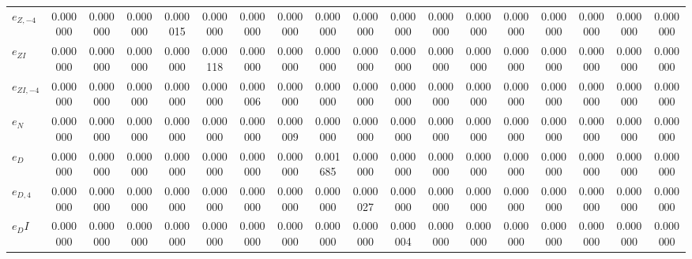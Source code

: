 \begin{center}
\begin{longtable}{lccccccccccccccccc}
${e_{Z,-4}}    $	 & 	        0.000000	 & 	        0.000000	 & 	        0.000000	 & 	        0.000015	 & 	        0.000000	 & 	        0.000000	 & 	        0.000000	 & 	        0.000000	 & 	        0.000000	 & 	        0.000000	 & 	        0.000000	 & 	        0.000000	 & 	        0.000000	 & 	        0.000000	 & 	        0.000000	 & 	        0.000000	 & 	        0.000000 \\ 
${e_{ZI}}      $	 & 	        0.000000	 & 	        0.000000	 & 	        0.000000	 & 	        0.000000	 & 	        0.000118	 & 	        0.000000	 & 	        0.000000	 & 	        0.000000	 & 	        0.000000	 & 	        0.000000	 & 	        0.000000	 & 	        0.000000	 & 	        0.000000	 & 	        0.000000	 & 	        0.000000	 & 	        0.000000	 & 	        0.000000 \\ 
${e_{ZI,-4}}   $	 & 	        0.000000	 & 	        0.000000	 & 	        0.000000	 & 	        0.000000	 & 	        0.000000	 & 	        0.000006	 & 	        0.000000	 & 	        0.000000	 & 	        0.000000	 & 	        0.000000	 & 	        0.000000	 & 	        0.000000	 & 	        0.000000	 & 	        0.000000	 & 	        0.000000	 & 	        0.000000	 & 	        0.000000 \\ 
${e_N}         $	 & 	        0.000000	 & 	        0.000000	 & 	        0.000000	 & 	        0.000000	 & 	        0.000000	 & 	        0.000000	 & 	        0.000009	 & 	        0.000000	 & 	        0.000000	 & 	        0.000000	 & 	        0.000000	 & 	        0.000000	 & 	        0.000000	 & 	        0.000000	 & 	        0.000000	 & 	        0.000000	 & 	        0.000000 \\ 
${e_D}         $	 & 	        0.000000	 & 	        0.000000	 & 	        0.000000	 & 	        0.000000	 & 	        0.000000	 & 	        0.000000	 & 	        0.000000	 & 	        0.001685	 & 	        0.000000	 & 	        0.000000	 & 	        0.000000	 & 	        0.000000	 & 	        0.000000	 & 	        0.000000	 & 	        0.000000	 & 	        0.000000	 & 	        0.000000 \\ 
${e_{D,4}}     $	 & 	        0.000000	 & 	        0.000000	 & 	        0.000000	 & 	        0.000000	 & 	        0.000000	 & 	        0.000000	 & 	        0.000000	 & 	        0.000000	 & 	        0.000027	 & 	        0.000000	 & 	        0.000000	 & 	        0.000000	 & 	        0.000000	 & 	        0.000000	 & 	        0.000000	 & 	        0.000000	 & 	        0.000000 \\ 
${e_DI}        $	 & 	        0.000000	 & 	        0.000000	 & 	        0.000000	 & 	        0.000000	 & 	        0.000000	 & 	        0.000000	 & 	        0.000000	 & 	        0.000000	 & 	        0.000000	 & 	        0.000004	 & 	        0.000000	 & 	        0.000000	 & 	        0.000000	 & 	        0.000000	 & 	        0.000000	 & 	        0.000000	 & 	        0.000000 \\ 

\end{longtable}
\end{center}
